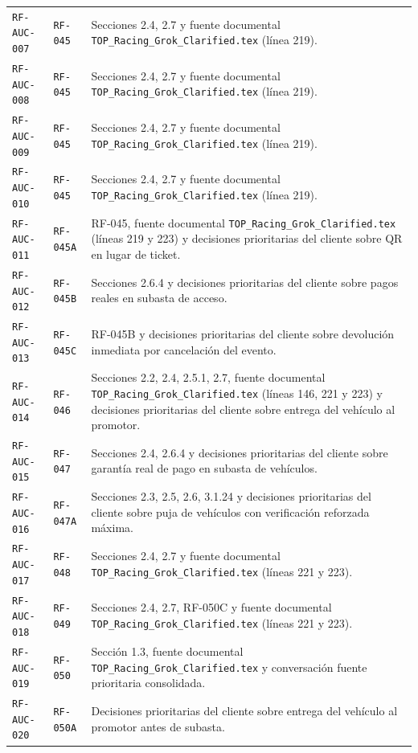 \documentclass[10pt,letterpaper]{article}
\begin{document}
\begin{landscape}
\begin{longtable}{P{2.7cm}P{2.6cm}P{15.7cm}}
\texttt{RF-AUC-007} & \texttt{RF-045} & Secciones 2.4, 2.7 y fuente documental \texttt{TOP\_Racing\_Grok\_Clarified.tex} (línea 219).\\
\texttt{RF-AUC-008} & \texttt{RF-045} & Secciones 2.4, 2.7 y fuente documental \texttt{TOP\_Racing\_Grok\_Clarified.tex} (línea 219).\\
\texttt{RF-AUC-009} & \texttt{RF-045} & Secciones 2.4, 2.7 y fuente documental \texttt{TOP\_Racing\_Grok\_Clarified.tex} (línea 219).\\
\texttt{RF-AUC-010} & \texttt{RF-045} & Secciones 2.4, 2.7 y fuente documental \texttt{TOP\_Racing\_Grok\_Clarified.tex} (línea 219).\\
\texttt{RF-AUC-011} & \texttt{RF-045A} & RF-045, fuente documental \texttt{TOP\_Racing\_Grok\_Clarified.tex} (líneas 219 y 223) y decisiones prioritarias del cliente sobre QR en lugar de ticket.\\
\texttt{RF-AUC-012} & \texttt{RF-045B} & Secciones 2.6.4 y decisiones prioritarias del cliente sobre pagos reales en subasta de acceso.\\
\texttt{RF-AUC-013} & \texttt{RF-045C} & RF-045B y decisiones prioritarias del cliente sobre devolución inmediata por cancelación del evento.\\
\texttt{RF-AUC-014} & \texttt{RF-046} & Secciones 2.2, 2.4, 2.5.1, 2.7, fuente documental \texttt{TOP\_Racing\_Grok\_Clarified.tex} (líneas 146, 221 y 223) y decisiones prioritarias del cliente sobre entrega del vehículo al promotor.\\
\texttt{RF-AUC-015} & \texttt{RF-047} & Secciones 2.4, 2.6.4 y decisiones prioritarias del cliente sobre garantía real de pago en subasta de vehículos.\\
\texttt{RF-AUC-016} & \texttt{RF-047A} & Secciones 2.3, 2.5, 2.6, 3.1.24 y decisiones prioritarias del cliente sobre puja de vehículos con verificación reforzada máxima.\\
\texttt{RF-AUC-017} & \texttt{RF-048} & Secciones 2.4, 2.7 y fuente documental \texttt{TOP\_Racing\_Grok\_Clarified.tex} (líneas 221 y 223).\\
\texttt{RF-AUC-018} & \texttt{RF-049} & Secciones 2.4, 2.7, RF-050C y fuente documental \texttt{TOP\_Racing\_Grok\_Clarified.tex} (líneas 221 y 223).\\
\texttt{RF-AUC-019} & \texttt{RF-050} & Sección 1.3, fuente documental \texttt{TOP\_Racing\_Grok\_Clarified.tex} y conversación fuente prioritaria consolidada.\\
\texttt{RF-AUC-020} & \texttt{RF-050A} & Decisiones prioritarias del cliente sobre entrega del vehículo al promotor antes de subasta.\\

\end{longtable}
\end{landscape}
\end{document}

